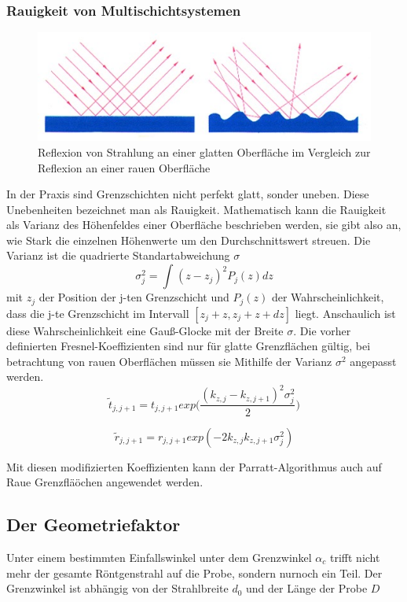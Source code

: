 \subsubsection{Rauigkeit von Multischichtsystemen}

\begin{figure}
    \includegraphics[width=\textwidth]{bilder/Rauigkeit.jpg}
    \caption{Reflexion von Strahlung an einer glatten Oberfläche im Vergleich zur Reflexion an einer rauen Oberfläche}
    \label{fig:Abbildung 4}
\end{figure}
\cite{Oberflächen}


In der Praxis sind Grenzschichten nicht perfekt glatt, sonder uneben. Diese Unebenheiten bezeichnet man als Rauigkeit.
Mathematisch kann die Rauigkeit als Varianz des Höhenfeldes einer Oberfläche beschrieben werden, sie gibt also an, wie Stark die einzelnen
Höhenwerte um den Durchschnittswert streuen. Die Varianz ist die quadrierte Standartabweichung $\sigma$ 
\begin{equation}
    \sigma^2_j=\int^{}(z-z_j)^2P_j(z)dz
\end{equation}
mit \(z_j\) der Position der j-ten Grenzschicht und \(P_j(z)\) der Wahrscheinlichkeit, dass die j-te
Grenzschicht im Intervall $[z_j+z,z_j+z+dz]$ liegt. Anschaulich ist diese Wahrscheinlichkeit eine Gauß-Glocke
mit der Breite $\sigma$. Die vorher definierten Fresnel-Koeffizienten sind nur für glatte Grenzflächen gültig, 
bei betrachtung von rauen Oberflächen müssen sie Mithilfe der Varianz $\sigma^2$ angepasst werden.
\begin{equation}
    \tilde{t}{_{j,j+1}}=t_{j,j+1}exp\Biggl(\frac{(k_{z,j}-k_{z,j+1})^{2}\sigma_j^2}{2}\Biggr)
\end{equation}

\begin{equation}
    \tilde{r}{_{j,j+1}}=r_{j,j+1}exp(-2k_{z,j}k_{z,j+1}\sigma_j^2)
\end{equation}

Mit diesen modifizierten Koeffizienten kann der Parratt-Algorithmus auch auf Raue Grenzfläöchen angewendet werden.
\subsection{Der Geometriefaktor}
Unter einem bestimmten Einfallswinkel unter dem Grenzwinkel $\alpha_c$ trifft nicht mehr der gesamte Röntgenstrahl
auf die Probe, sondern nurnoch ein Teil. Der Grenzwinkel ist abhängig von der Strahlbreite $d_0$ und der Länge der Probe \(D\)

